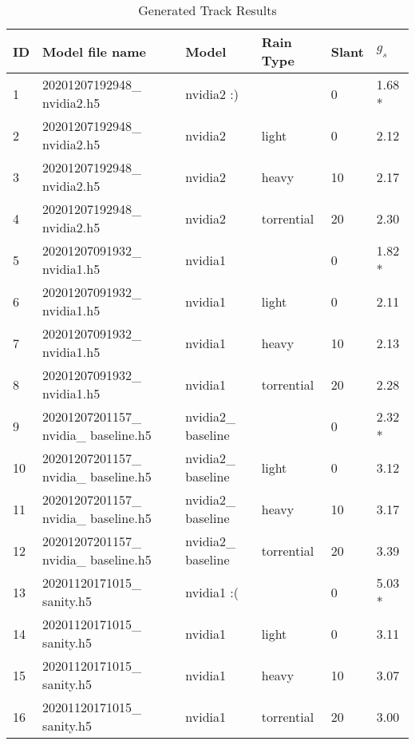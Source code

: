 \begin{table}
  \caption{Generated Track Results}
  \label{generated-track-table}
  \centering
  \begin{tabular}{llllll}
    \toprule
    ID & Model file name & Model & Rain Type & Slant & $g_s$ \\ 
    \midrule
    1 & 20201207192948\_ nvidia2.h5 & nvidia2 :) &  & 0 & 1.68 * \\ 
    2 & 20201207192948\_ nvidia2.h5 & nvidia2 & light & 0 & 2.12 \\ 
    3 & 20201207192948\_ nvidia2.h5 & nvidia2 & heavy & 10 & 2.17 \\ 
    4 & 20201207192948\_ nvidia2.h5 & nvidia2 & torrential & 20 & 2.30 \\ 
    5 & 20201207091932\_ nvidia1.h5 & nvidia1 &  & 0 & 1.82 * \\ 
    6 & 20201207091932\_ nvidia1.h5 & nvidia1 & light & 0 & 2.11 \\ 
    7 & 20201207091932\_ nvidia1.h5 & nvidia1 & heavy & 10 & 2.13 \\ 
    8 & 20201207091932\_ nvidia1.h5 & nvidia1 & torrential & 20 & 2.28 \\ 
    9 & 20201207201157\_ nvidia\_ baseline.h5 & nvidia2\_ baseline &  & 0 & 2.32 * \\ 
    10 & 20201207201157\_ nvidia\_ baseline.h5 & nvidia2\_ baseline & light & 0 & 3.12 \\ 
    11 & 20201207201157\_ nvidia\_ baseline.h5 & nvidia2\_ baseline & heavy & 10 & 3.17 \\ 
    12 & 20201207201157\_ nvidia\_ baseline.h5 & nvidia2\_ baseline & torrential & 20 & 3.39 \\ 
    13 & 20201120171015\_ sanity.h5 & nvidia1 :( &  & 0 & 5.03 * \\ 
    14 & 20201120171015\_ sanity.h5 & nvidia1 & light & 0 & 3.11 \\ 
    15 & 20201120171015\_ sanity.h5 & nvidia1 & heavy & 10 & 3.07 \\ 
    16 & 20201120171015\_ sanity.h5 & nvidia1 & torrential & 20 & 3.00 \\ 
    \bottomrule
  \end{tabular}
\end{table}

